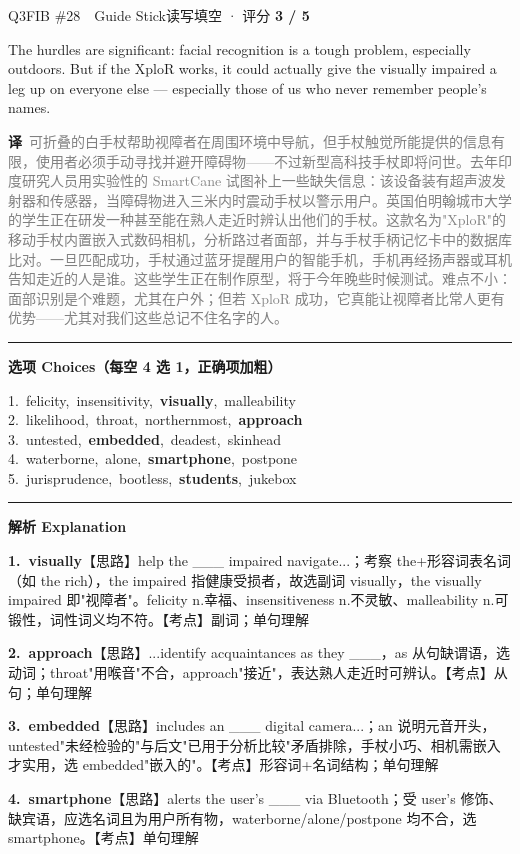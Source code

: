 \documentclass[11pt]{article}
\newcommand{\ptesub}[1]{%
  \par\needspace{2\baselineskip}\smallskip
  {\color{cAccent}\rule[-0.2ex]{3pt}{1.05em}}\hspace{6pt}%
  {\bfseries\color{cHead}#1}\par\nopagebreak\smallskip}
\newcommand{\zh}[1]{{\footnotesize\textcolor{cNote}{\textbf{译}}\ \textcolor{gray}{#1}}}
\begin{document}
\begin{qblock}{Q3\quad FIB \#28\ \ Guide Stick}{读写填空 · 评分 \textcolor{cAccent}{\bfseries 3 / 5}}
\begin{promptbox}
The hurdles are significant: facial recognition is a tough problem, especially outdoors. But if the XploR works, it could actually give the visually impaired a leg up on everyone else --- especially those of us who never remember people's names.
\end{promptbox}
\zh{可折叠的白手杖帮助视障者在周围环境中导航，但手杖触觉所能提供的信息有限，使用者必须手动寻找并避开障碍物——不过新型高科技手杖即将问世。去年印度研究人员用实验性的 SmartCane 试图补上一些缺失信息：该设备装有超声波发射器和传感器，当障碍物进入三米内时震动手杖以警示用户。英国伯明翰城市大学的学生正在研发一种甚至能在熟人走近时辨认出他们的手杖。这款名为"XploR"的移动手杖内置嵌入式数码相机，分析路过者面部，并与手杖手柄记忆卡中的数据库比对。一旦匹配成功，手杖通过蓝牙提醒用户的智能手机，手机再经扬声器或耳机告知走近的人是谁。这些学生正在制作原型，将于今年晚些时候测试。难点不小：面部识别是个难题，尤其在户外；但若 XploR 成功，它真能让视障者比常人更有优势——尤其对我们这些总记不住名字的人。}
\ptesub{选项 Choices（每空 4 选 1，正确项加粗）}
{\small
1.\ felicity,\ insensitivity,\ \textbf{visually},\ malleability\\
2.\ likelihood,\ throat,\ northernmost,\ \textbf{approach}\\
3.\ untested,\ \textbf{embedded},\ deadest,\ skinhead\\
4.\ waterborne,\ alone,\ \textbf{smartphone},\ postpone\\
5.\ jurisprudence,\ bootless,\ \textbf{students},\ jukebox}
\ptesub{解析 Explanation}
\begin{notebox}\footnotesize
\textbf{1.\ visually}\quad【思路】help the \_\_\_ impaired navigate...；考察 the+形容词表名词（如 the rich），the impaired 指健康受损者，故选副词 visually，the visually impaired 即"视障者"。felicity n.幸福、insensitiveness n.不灵敏、malleability n.可锻性，词性词义均不符。【考点】副词；单句理解\par\smallskip
\textbf{2.\ approach}\quad【思路】...identify acquaintances as they \_\_\_，as 从句缺谓语，选动词；throat"用喉音"不合，approach"接近"，表达熟人走近时可辨认。【考点】从句；单句理解\par\smallskip
\textbf{3.\ embedded}\quad【思路】includes an \_\_\_ digital camera...；an 说明元音开头，untested"未经检验的"与后文"已用于分析比较"矛盾排除，手杖小巧、相机需嵌入才实用，选 embedded"嵌入的"。【考点】形容词+名词结构；单句理解\par\smallskip
\textbf{4.\ smartphone}\quad【思路】alerts the user's \_\_\_ via Bluetooth；受 user's 修饰、缺宾语，应选名词且为用户所有物，waterborne/alone/postpone 均不合，选 smartphone。【考点】单句理解\par\smallskip

\end{notebox}
\end{qblock}
\end{document}
